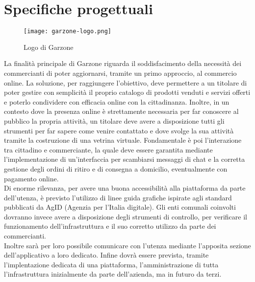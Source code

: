 \section{Specifiche progettuali}
\begin{figure}[!htb]
    \centering
    \texttt{[image: garzone-logo.png]}
    \caption{Logo di Garzone}
\end{figure}
La finalità principale di Garzone riguarda il soddisfacimento della necessità dei commercianti di poter aggiornarsi, tramite un primo approccio, al commercio online. La soluzione, per raggiungere l'obiettivo, deve permettere a un titolare di poter gestire con semplicità il proprio catalogo di prodotti venduti e servizi offerti e poterlo condividere con efficacia online con la cittadinanza. Inoltre, in un contesto dove la presenza online è strettamente necessaria per far conoscere al pubblico la propria attività, un titolare deve avere a disposizione tutti gli strumenti per far sapere come venire contattato e dove svolge la sua attività tramite la costruzione di una vetrina virtuale. Fondamentale è poi l'interazione tra cittadino e commerciante, la quale deve essere garantita mediante l'implementazione di un'interfaccia per scambiarsi messaggi di chat e la corretta gestione degli ordini di ritiro e di consegna a domicilio, eventualmente con pagamento online. \\Di enorme rilevanza, per avere una buona accessibilità alla piattaforma da parte dell'utenza, è previsto l'utilizzo di linee guida grafiche ispirate agli standard pubblicati da AgID (Agenzia per l'Italia digitale). Gli enti comunali coinvolti dovranno invece avere a disposizione degli strumenti di controllo, per verificare il funzionamento dell'infrastruttura e il suo corretto utilizzo da parte dei commercianti. \\Inoltre sarà per loro possibile comunicare con l'utenza mediante l'apposita sezione dell'applicativo a loro dedicato. Infine dovrà essere prevista, tramite l'implentazione dedicata di una piattaforma, l'amministrazione di tutta l'infrastruttura inizialmente da parte dell'azienda, ma in futuro da terzi. 
